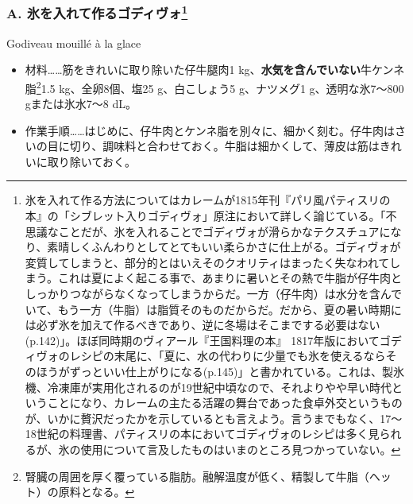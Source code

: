 \begin{recette}

\hypertarget{godiveau-mouille-a-la-glace}{%
\subsubsection[A. 氷を入れて作るゴディヴォ]{\texorpdfstring{A.
氷を入れて作るゴディヴォ\footnote{氷を入れて作る方法についてはカレームが1815年刊『パリ風パティスリの本』の「シブレット入りゴディヴォ」原注において詳しく論じている。「不思議なことだが、氷を入れることでゴディヴォが滑らかなテクスチュアになり、素晴しくふんわりとしてとてもいい柔らかさに仕上がる。ゴディヴォが変質してしまうと、部分的とはいえそのクオリティはまったく失なわれてしまう。これは夏によく起こる事で、あまりに暑いとその熱で牛脂が仔牛肉としっかりつながらなくなってしまうからだ。一方（仔牛肉）は水分を含んでいて、もう一方（牛脂）は脂質そのものだからだ。だから、夏の暑い時期には必ず氷を加えて作るべきであり、逆に冬場はそこまでする必要はない(p.142)」。ほぼ同時期のヴィアール『王国料理の本』
  1817年版においてゴディヴォのレシピの末尾に、「夏に、水の代わりに少量でも氷を使えるならそのほうがずっといい仕上がりになる(p.145)」と書かれている。これは、製氷機、冷凍庫が実用化されるのが19世紀中頃なので、それよりやや早い時代ということになり、カレームの主たる活躍の舞台であった食卓外交というものが、いかに贅沢だったかを示しているとも言えよう。言うまでもなく、17〜18世紀の料理書、パティスリの本においてゴディヴォのレシピは多く見られるが、氷の使用について言及したものはいまのところ見つかっていない。}}{A. 氷を入れて作るゴディヴォ}}\label{godiveau-mouille-a-la-glace}}

\begin{frsubenv}

Godiveau mouillé à la glace

\end{frsubenv}


\begin{itemize}
\item
  材料\ldots{}\ldots{}筋をきれいに取り除いた仔牛腿肉1
  kg、\textbf{水気を含んでいない}牛ケンネ脂\footnote{腎臓の周囲を厚く覆っている脂肪。融解温度が低く、精製して牛脂（ヘット）の原料となる。}1.5
  kg、全卵8個、塩25 g、白こしょう5 g、ナツメグ1 g、透明な氷7〜800
  gまたは氷水7〜8 dL。
\item
  作業手順\ldots{}\ldots{}はじめに、仔牛肉とケンネ脂を別々に、細かく刻む。仔牛肉はさいの目に切り、調味料と合わせておく。牛脂は細かくして、薄皮は筋はきれいに取り除いておく。
\end{itemize}


\end{recette}
